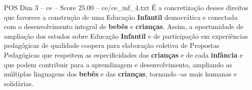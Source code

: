\begin{textsample}{POS Dim 3 – ce – Score 25.00 – ce/ce\_inf\_4.txt}
É a concretização desses direitos que favorece a construção de uma Educação \textbf{Infantil} democrática e conectada com o desenvolvimento integral de \textbf{bebês} e \textbf{crianças}.
Assim, a oportunidade de ampliação dos estudos sobre Educação \textbf{Infantil} e de participação em experiências pedagógicas de qualidade coopera para elaboração coletiva de Propostas Pedagógicas que respeitem as especificidades das \textbf{crianças} e de cada \textbf{infância} e que podem contribuir para a aprendizagem e desenvolvimento, ampliando as múltiplas linguagens dos \textbf{bebês} e das \textbf{crianças}, tornando -as mais humanas e solidárias.

\end{textsample}

